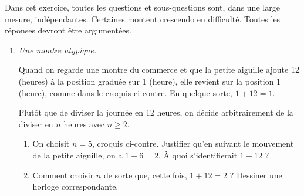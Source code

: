 Dans cet exercice, toutes les questions et sous-questions sont, dans une large mesure, indépendantes. Certaines montent crescendo en difficulté. Toutes les réponses devront être argumentées.

\medskip
 
\noindent\begin{minipage}{.6\linewidth}
\begin{enumerate}
\item \textit{Une montre atypique.} 

Quand on regarde une montre du commerce et que la petite aiguille ajoute 12 (heures) à la position graduée sur 1 (heure), elle revient sur la position 1 (heure), comme dans le croquis ci-contre. En quelque sorte, \( 1 + 12 = 1 \).

Plutôt que de diviser la journée en 12 heures, on décide arbitrairement de la diviser en $n$ heures avec \( n \geqslant 2 \).

\begin{enumerate}
\item On choisit \( n = 5 \), croquis ci-contre. Justifier qu'en suivant le mouvement de la petite aiguille, on a \( 1 + 6 = 2 \). À quoi s'identifierait \( 1 + 12 \) ?

\item Comment choisir \( n \) de sorte que, cette fois, \( 1 + 12 = 2 \) ? Dessiner une horloge correspondante.
\end{enumerate}
\end{enumerate}
\end{minipage}
